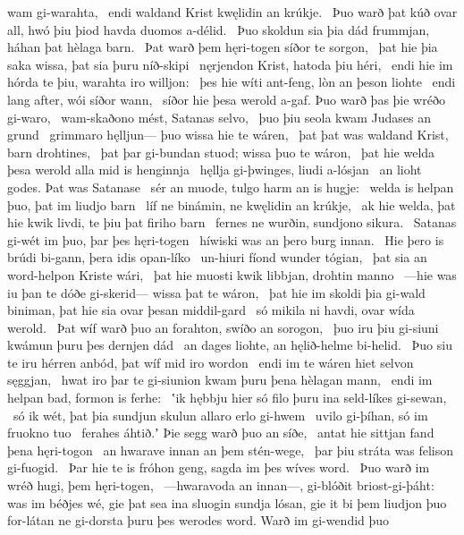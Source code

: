 wam gi-warahta, \hld\ endi waldand Krist
kwęlidin an krúkje. \hld\ Þuo warð þat kúð ovar all,
hwó þiu þiod havda duomos a-délid. \hld\ Þuo skoldun sia þia dád frummjan,
háhan þat hèlaga barn. \hld\ Þat warð þem hęri-togen
síðor te sorgon, \hld\ þat hie þia saka wissa,
þat sia þuru níð-skipi \hld\ nęrjendon Krist,
hatoda þiu héri, \hld\ endi hie im hórda te þiu,
warahta iro willjon: \hld\ þes hie wíti ant-feng,
lòn an þeson liohte \hld\ endi lang after,
wói síðor wann, \hld\ síðor hie þesa werold a-gaf. %
Þuo warð þas þie wréðo gi-waro, \hld\ wam-skaðono mést,
Satanas selvo, \hld\ þuo þiu seola kwam
Judases an grund \hld\ grimmaro hęlljun—
þuo wissa hie te wáren, \hld\ þat þat was waldand Krist,
barn drohtines, \hld\ þat þar gi-bundan stuod;
wissa þuo te wáron, \hld\ þat hie welda þesa werold alla
mid is henginnja \hld\ hęllja gi-þwinges,
liudi a-lósjan \hld\ an lioht godes.
Þat was Satanase \hld\ sér an muode,
tulgo harm an is hugje: \hld\ welda is helpan þuo,
þat im liudjo barn \hld\ líf ne binámin,
ne kwęlidin an krúkje, \hld\ ak hie welda, þat hie kwik livdi,
te þiu þat firiho barn \hld\ fernes ne wurðin,
sundjono sikura. \hld\ Satanas gi-wét im þuo,
þar þes hęri-togen \hld\ híwiski was
an þero burg innan. \hld\ Hie þero is brúdi bi-gann,
þera idis opan-líko \hld\ un-hiuri fíond
wunder tógian, \hld\ þat sia an word-helpon
Kriste wári, \hld\ þat hie muosti kwik libbjan,
drohtin manno \hld\ —hie was iu þan te dóðe gi-skerid—
wissa þat te wáron, \hld\ þat hie im skoldi þia gi-wald biniman,
þat hie sia ovar þesan middil-gard \hld\ só mikila ni havdi,
ovar wída werold. \hld\ Þat wíf warð þuo an forahton,
swíðo an sorogon, \hld\ þuo iru þiu gi-siuni kwámun
þuru þes dernjen dád \hld\ an dages liohte,
an hęlið-helme bi-helid. \hld\ Þuo siu te iru hérren anbód,
þat wíf mid iro wordon \hld\ endi im te wáren hiet
selvon sęggjan, \hld\ hwat iro þar te gi-siunion kwam
þuru þena hèlagan mann, \hld\ endi im helpan bad,
formon is ferhe: \hld\ ʽik hębbju hier só filo þuru ina
seld-líkes gi-sewan, \hld\ só ik wét, þat þia sundjun skulun
allaro erlo gi-hwem \hld\ uvilo gi-þíhan,
só im fruokno tuo \hld\ ferahes áhtið.ʼ
Þie segg warð þuo an síðe, \hld\ antat hie sittjan fand
þena hęri-togon \hld\ an hwarave innan
an þem stén-wege, \hld\ þar þiu stráta was
felison gi-fuogid. \hld\ Þar hie te is fróhon geng,
sagda im þes wíves word. \hld\ Þuo warð im wréð hugi,
þem hęri-togen, \hld\ —hwaravoda an innan—,
gi-blóðit briost-gi-þáht: was im béðjes wé,
gie þat sea ina sluogin sundja lósan,
gie it bi þem liudjon þuo for-látan ne gi-dorsta
þuru þes werodes word. Warð im gi-wendid þuo
